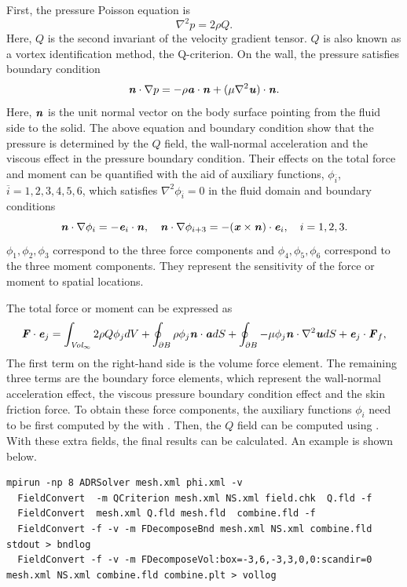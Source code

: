 First, the pressure Poisson equation is
\[
\nabla^2 p = 2\rho Q.
\]
Here, $Q$ is the second invariant of the velocity gradient tensor. $Q$ is also known as a vortex identification method, the Q-criterion. On the wall, the pressure satisfies boundary condition
\[
\textbf{\emph{n}}\cdot\nabla p = -\rho\textbf{\emph{a}}\cdot\textbf{\emph{n}} + (\mu \nabla^2\textbf{\emph{u}})\cdot\textbf{\emph{n}}.
\]
Here, $\textbf{\emph{n}}$ is the unit normal vector on the body surface pointing from the fluid side to the solid.
The above equation and boundary condition show that the pressure is determined by the $Q$ field, the wall-normal acceleration and the viscous effect in the pressure boundary condition. Their effects on the total force and moment can be quantified with the aid of auxiliary functions, $\phi_{\overline{i}}$, ${\overline{i}}=1,2,3,4,5,6$, which satisfies $\nabla^2 \phi_{\overline{i}}=0$ in the fluid domain and boundary conditions
\[
\textbf{\emph{n}}\cdot\nabla \phi_i = -\textbf{\emph{e}}_i\cdot\textbf{\emph{n}},\quad \textbf{\emph{n}}\cdot\nabla \phi_{i+3} = -(\textbf{\emph{x}}\times\textbf{\emph{n}})\cdot\textbf{\emph{e}}_i, \quad i=1,2,3.
\]
$\phi_1,\phi_2,\phi_3$ correspond to the three force components and $\phi_4,\phi_5,\phi_6$ correspond to the three moment components. They represent the sensitivity of the force or moment to spatial locations.

The total force or moment can be expressed as
\[
\textbf{\emph{F}}\cdot\textbf{\emph{e}}_j = \int_{\textit{Vol}_\infty}{2\rho Q \phi_j d V} + \oint_{\partial B}{\rho\phi_j\textbf{\emph{n}}\cdot\textbf{\emph{a}} d S} + \oint_{\partial B}{-\mu\phi_j\textbf{\emph{n}}\cdot\nabla^2\textbf{\emph{u}} d S} + \textbf{\emph{e}}_j\cdot\textbf{\emph{F}}_f,
\]
The first term on the right-hand side is the volume force element. The remaining three terms are the boundary force elements, which represent the wall-normal acceleration effect, the viscous pressure boundary condition effect and the skin friction force. To obtain these force components, the auxiliary functions $\phi_i$ need to be first computed by the  with . Then, the $Q$ field can be computed using . With these extra fields, the final results can be calculated. An example is shown below.

\begin{lstlisting}[style=BashInputStyle]
  mpirun -np 8 ADRSolver mesh.xml phi.xml -v
  FieldConvert  -m QCriterion mesh.xml NS.xml field.chk  Q.fld -f
  FieldConvert  mesh.xml Q.fld mesh.fld  combine.fld -f
  FieldConvert -f -v -m FDecomposeBnd mesh.xml NS.xml combine.fld stdout > bndlog
  FieldConvert -f -v -m FDecomposeVol:box=-3,6,-3,3,0,0:scandir=0 mesh.xml NS.xml combine.fld combine.plt > vollog
\end{lstlisting}

